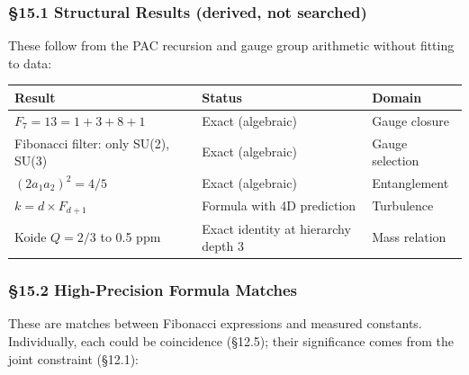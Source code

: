 \documentclass[
  11pt,
  a4paper]{article}
\begin{document}
\subsubsection{§15.1 Structural Results (derived, not
searched)}\label{structural-results-derived-not-searched}

These follow from the PAC recursion and gauge group arithmetic without
fitting to data:

\begin{longtable}[]{@{}
  >{\raggedright\arraybackslash}p{}
  >{\raggedright\arraybackslash}p{}
  >{\raggedright\arraybackslash}p{}@{}}
\toprule\noalign{}
\begin{minipage}[b]{\linewidth}\raggedright
Result
\end{minipage} & \begin{minipage}[b]{\linewidth}\raggedright
Status
\end{minipage} & \begin{minipage}[b]{\linewidth}\raggedright
Domain
\end{minipage} \\
\midrule\noalign{}
\endhead
\bottomrule\noalign{}
\endlastfoot
\(F_7 = 13 = 1 + 3 + 8 + 1\) & Exact (algebraic) & Gauge closure \\
Fibonacci filter: only SU(2), SU(3) & Exact (algebraic) & Gauge
selection \\
\((2a_1 a_2)^2 = 4/5\) & Exact (algebraic) & Entanglement \\
\(k = d \times F_{d+1}\) & Formula with 4D prediction & Turbulence \\
Koide \(Q = 2/3\) to 0.5 ppm & Exact identity at hierarchy depth 3 &
Mass relation \\
\end{longtable}

\subsubsection{§15.2 High-Precision Formula
Matches}\label{high-precision-formula-matches}

These are matches between Fibonacci expressions and measured constants.
Individually, each could be coincidence (§12.5); their significance
comes from the joint constraint (§12.1):
\end{document}
